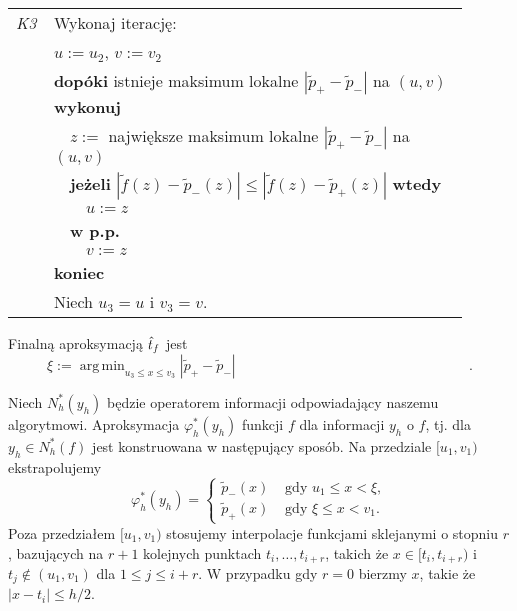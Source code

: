 \documentclass[oik, pdftex, robocza, man]{mgrwms}
\DeclareMathOperator*{\argmin}{arg\,min}
\begin{document}
    \begin{table}[H]
        \begin{tabular}{p{0.045\linewidth} p{0.85\linewidth}}
        \textit{K3} & Wykonaj iterację: \\
                        & $u := u_2$, $v := v_2$ \\
                        & \textbf{dopóki} istnieje maksimum lokalne $|\tilde{p}_{+} - \tilde{p}_{-}|$ na $(u,v)$ \textbf{wykonuj} \\
                        & $\quad$$z :=$ największe maksimum lokalne $|\tilde{p}_{+} - \tilde{p}_{-}|$ na $(u,v)$ \\
                        & $\quad$\textbf{jeżeli} $|\tilde{f}(z) - \tilde{p}_{-}(z)| \leq |\tilde{f}(z) - \tilde{p}_{+}(z)|$ \textbf{wtedy} \\
                        & $\quad\quad$$u:= z$ \\
                        & $\quad$\textbf{w p.p.} \\
                        & $\quad\quad$$v:= z$ \\
                        & \textbf{koniec} \\
                        & Niech $u_3 = u$ i $v_3 = v$.
        \end{tabular}
    \end{table}

    Finalną aproksymacją $\hat{t}_f$ jest
    \begin{equation*}
            \xi := \argmin_{u_3 \leq x \leq v_3}|\tilde{p}_{+} - \tilde{p}_{-}| \hspace{200pt}.
    \end{equation*}

    Niech $N_{h}^{*}(y_{h})$ będzie operatorem informacji odpowiadający naszemu algorytmowi. Aproksymacja $\varphi_{h}^{*}(y_{h})$ funkcji $f$ dla informacji $y_{h}$ o $f$, tj. dla $y_{h} \in N_{h}^{*}(f)$ jest konstruowana w następujący sposób. Na przedziale $[u_{1}, v_{1})$ ekstrapolujemy
    \begin{equation*}
        \varphi_{h}^{*}\left(y_{h}\right)= \begin{cases}
            \tilde{p}_{-}(x) & \text { gdy } u_{1} \leq x< \xi, \\
            \tilde{p}_{+}(x) & \text { gdy } \xi \leq x<v_{1}.
        \end{cases}
    \end{equation*}
    Poza przedziałem $[u_{1}, v_{1})$ stosujemy interpolacje funkcjami sklejanymi o stopniu $r$, bazujących na $r+1$ kolejnych punktach $t_{i}, \ldots, t_{i+r}$, takich że $x \in [t_{i},t_{i+r})$ i $t_{j} \notin (u_{1},v_{1})$ dla $1 \leq j \leq i+r$. W przypadku gdy $r=0$ bierzmy $x$, takie że $|x-t_{i}| \leq h/2$.
\end{document}
